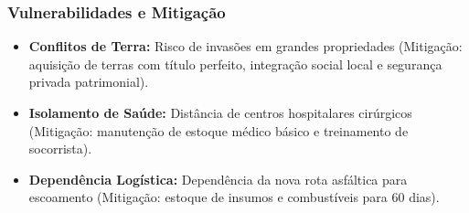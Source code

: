 \subsubsection{Vulnerabilidades e
Mitigação}

\begin{itemize}
\tightlist
\item
  \textbf{Conflitos de Terra:} Risco de invasões em grandes propriedades
  (Mitigação: aquisição de terras com título perfeito, integração social
  local e segurança privada patrimonial).
\item
  \textbf{Isolamento de Saúde:} Distância de centros hospitalares
  cirúrgicos (Mitigação: manutenção de estoque médico básico e
  treinamento de socorrista).
\item
  \textbf{Dependência Logística:} Dependência da nova rota asfáltica
  para escoamento (Mitigação: estoque de insumos e combustíveis para 60
  dias).
\end{itemize}

